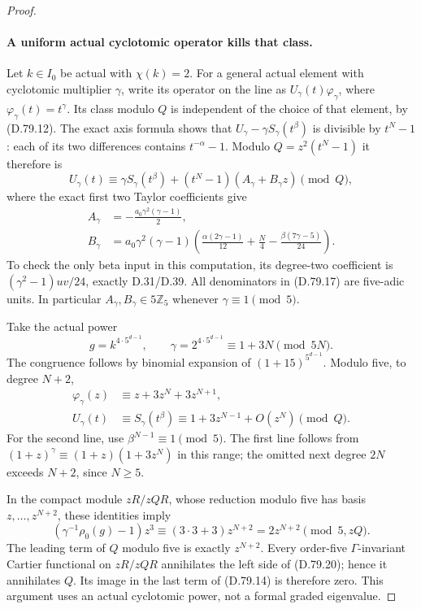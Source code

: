 \begin{proof}
\paragraph{A uniform actual cyclotomic operator kills that class.}
Let \(k\in I_0\) be actual with \(\chi(k)=2\). For a general
actual element with cyclotomic multiplier \(\gamma\), write its
operator on the line as \(U_\gamma(t)\varphi_\gamma\), where
\(\varphi_\gamma(t)=t^\gamma\). Its class modulo \(Q\) is
independent of the choice of that element, by (D.79.12).
The exact axis formula shows that
\(U_\gamma-\gamma S_\gamma(t^\beta)\) is divisible by
\(t^N-1\): each of its two differences contains
\(t^{-\alpha}-1\). Modulo \(Q=z^2(t^N-1)\) it therefore is
\[
 U_\gamma(t)\equiv
 \gamma S_\gamma(t^\beta)+(t^N-1)(A_\gamma+B_\gamma z)
                                                      \pmod Q,\tag{D.79.16}
\]
where the exact first two Taylor coefficients give
\[
 \begin{split}
 A_\gamma&=-\frac{a_0\gamma^2(\gamma-1)}2,\\
 B_\gamma&=a_0\gamma^2(\gamma-1)
       \left(\frac{\alpha(2\gamma-1)}{12}
                    +\frac N4-\frac{\beta(7\gamma-5)}{24}\right).
 \end{split}                                             \tag{D.79.17}
\]
To check the only beta input in this computation, its degree-two
coefficient is \((\gamma^2-1)uv/24\), exactly D.31/D.39.
All denominators in (D.79.17) are five-adic units. In particular
\(A_\gamma,B_\gamma\in5\mathbb Z_5\) whenever
\(\gamma\equiv1\pmod5\).

Take the actual power
\[
 g=k^{4\cdot5^{d-1}},\qquad
 \gamma=2^{4\cdot5^{d-1}}
                  \equiv1+3N\pmod{5N}.               \tag{D.79.18}
\]
The congruence follows by binomial expansion of
\((1+15)^{5^{d-1}}\). Modulo five, to degree \(N+2\),
\[
 \begin{split}
 \varphi_\gamma(z)&\equiv z+3z^N+3z^{N+1},\\
 U_\gamma(t)&\equiv S_\gamma(t^\beta)
                 \equiv1+3z^{N-1}+O(z^N)\pmod Q.
 \end{split}                                             \tag{D.79.19}
\]
For the second line, use \(\beta^{N-1}\equiv1\pmod5\).
The first line follows from
\((1+z)^\gamma\equiv(1+z)(1+3z^N)\) in this range;
the omitted next degree \(2N\) exceeds \(N+2\), since
\(N\ge5\).

In the compact module \(zR/zQR\), whose reduction modulo five
has basis \(z,\ldots,z^{N+2}\), these identities imply
\[
 (\gamma^{-1}\rho_0(g)-1)z^3
       \equiv (3\cdot3+3)z^{N+2}
       =2z^{N+2}\pmod{5,zQ}.                           \tag{D.79.20}
\]
The leading term of \(Q\) modulo five is exactly \(z^{N+2}\).
Every order-five \(\Gamma\)-invariant Cartier functional on
\(zR/zQR\) annihilates the left side of (D.79.20); hence it
annihilates \(Q\). Its image in the last term of (D.79.14)
is therefore zero. This argument uses an actual cyclotomic
power, not a formal graded eigenvalue.


\end{proof}

